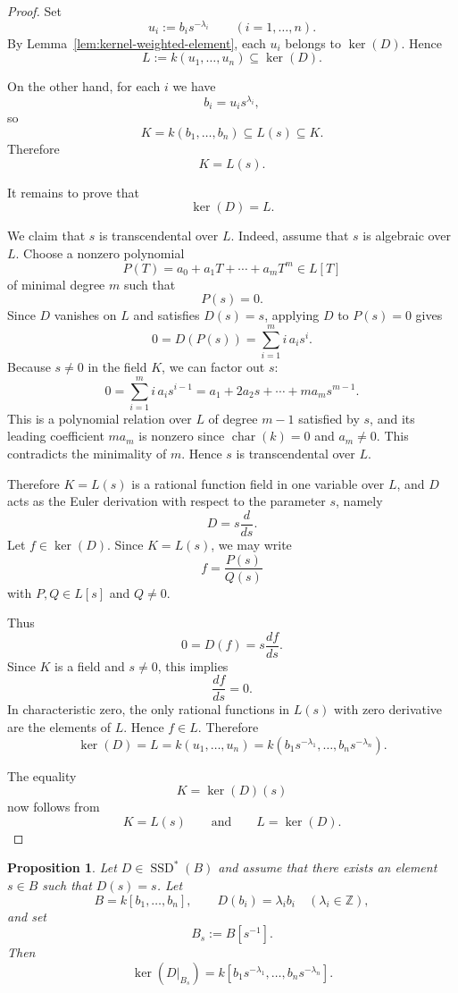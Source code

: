 \documentclass[12pt]{amsart}
\newtheorem{proposition}[theorem]{Proposition}
\newcommand{\Z}{\mathbb Z}
\newcommand{\SSD}{\operatorname{SSD}}
\begin{document}
\begin{proof}
Set
\[
u_i:=b_i s^{-\lambda_i}\qquad (i=1,\dots,n).
\]
By Lemma~\ref{lem:kernel-weighted-element}, each $u_i$ belongs to $\ker(D)$. Hence
\[
L:=k(u_1,\dots,u_n)\subseteq \ker(D).
\]

On the other hand, for each $i$ we have
\[
b_i=u_i s^{\lambda_i},
\]
so
\[
K=k(b_1,\dots,b_n)\subseteq L(s)\subseteq K.
\]
Therefore
\[
K=L(s).
\]

It remains to prove that
\[
\ker(D)=L.
\]

We claim that $s$ is transcendental over $L$. Indeed, assume that $s$ is algebraic over $L$.
Choose a nonzero polynomial
\[
P(T)=a_0+a_1T+\cdots+a_mT^m\in L[T]
\]
of minimal degree $m$ such that
\[
P(s)=0.
\]
Since $D$ vanishes on $L$ and satisfies $D(s)=s$, applying $D$ to $P(s)=0$ gives
\[
0=D(P(s))=\sum_{i=1}^m i\,a_i s^i.
\]
Because $s\neq 0$ in the field $K$, we can factor out $s$:
\[
0=\sum_{i=1}^m i\,a_i s^{i-1} = a_1 + 2a_2 s + \cdots + m a_m s^{m-1}.
\]
This is a polynomial relation over $L$ of degree $m-1$ satisfied by $s$, and its leading
coefficient $m a_m$ is nonzero since $\operatorname{char}(k)=0$ and $a_m\neq 0$.
This contradicts the minimality of $m$. Hence $s$ is transcendental over $L$.

Therefore $K=L(s)$ is a rational function field in one variable over $L$, and $D$ acts as the Euler derivation with respect to the parameter $s$, namely
\[
D=s\frac{d}{ds}.
\]
Let $f\in \ker(D)$. Since $K=L(s)$, we may write
\[
f=\frac{P(s)}{Q(s)}
\]
with $P,Q\in L[s]$ and $Q\neq 0$.

Thus
\[
0=D(f)=s\frac{df}{ds}.
\]
Since $K$ is a field and $s\neq 0$, this implies
\[
\frac{df}{ds}=0.
\]
In characteristic zero, the only rational functions in $L(s)$ with zero derivative are the elements of $L$. Hence $f\in L$. Therefore
\[
\ker(D)=L
=
k(u_1,\dots,u_n)
=
k\left(b_1s^{-\lambda_1},\dots,b_ns^{-\lambda_n}\right).
\]

The equality
\[
K=\ker(D)(s)
\]
now follows from
\[
K=L(s)
\qquad\text{and}\qquad
L=\ker(D).
\]
\end{proof}

\begin{proposition}\label{prop:kernel-localization}
Let $D\in \SSD^{*}(B)$ and assume that there exists an element $s\in B$
such that $D(s)=s$.
Let
\[
B=k[b_1,\dots,b_n],
\qquad
D(b_i)=\lambda_i b_i \quad (\lambda_i\in \Z),
\]
and set
\[
B_s:=B[s^{-1}].
\]
Then
\[
\ker(D|_{B_s})=
k\!\left[b_1s^{-\lambda_1},\dots,b_ns^{-\lambda_n}\right].
\]
\end{proposition}
\end{document}
